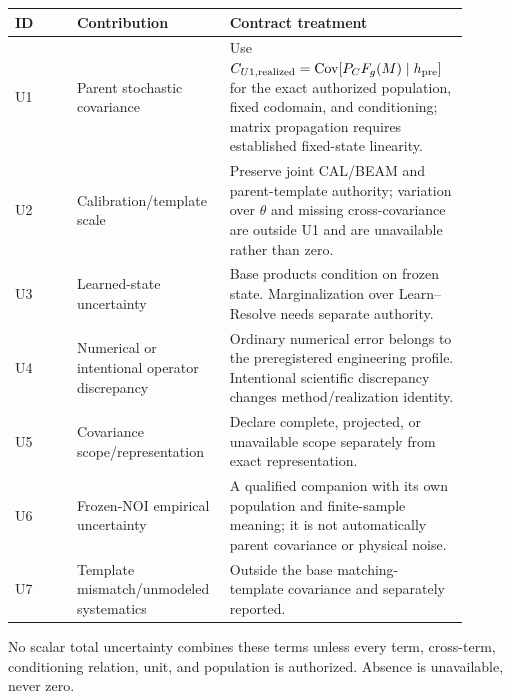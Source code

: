\begin{longtable}{p{0.13\linewidth}p{0.29\linewidth}p{0.48\linewidth}}
\toprule
ID & Contribution & Contract treatment \\
\midrule
\endhead
U1 & Parent stochastic covariance & Use
$C_{U1,{\rm realized}}=\operatorname{Cov}[P_CF_g(M)\mid h_{\rm pre}]$ for the exact
authorized population, fixed codomain, and conditioning; matrix propagation
requires established fixed-state linearity. \\
U2 & Calibration/template scale & Preserve joint CAL/BEAM and parent-template
authority; variation over $\theta$ and missing cross-covariance are outside U1
and are unavailable rather than zero. \\
U3 & Learned-state uncertainty & Base products condition on frozen state.
Marginalization over Learn--Resolve needs separate authority. \\
U4 & Numerical or intentional operator discrepancy & Ordinary numerical error
belongs to the preregistered engineering profile. Intentional scientific
discrepancy changes method/realization identity. \\
U5 & Covariance scope/representation & Declare complete, projected, or
unavailable scope separately from exact representation. \\
U6 & Frozen-NOI empirical uncertainty & A qualified companion with its own
population and finite-sample meaning; it is not automatically parent
covariance or physical noise. \\
U7 & Template mismatch/unmodeled systematics & Outside the base matching-
template covariance and separately reported. \\
\bottomrule
\end{longtable}

No scalar total uncertainty combines these terms unless every term,
cross-term, conditioning relation, unit, and population is authorized.
Absence is unavailable, never zero.
